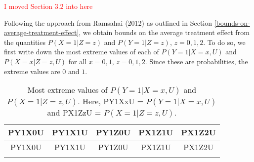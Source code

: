 \documentclass[
]{article}
\theoremstyle{plain}
\begin{document}
\textcolor{red}{I moved Section 3.2 into here}

Following the approach from Ramsahai (2012) as outlined in Section \ref{bounds-on-average-treatment-effect}, we obtain bounds on the average treatment effect from the quantities \(P(X = 1 | Z = z)\) and \(P(Y = 1 | Z = z)\), \(z = 0,1,2\). To do so, we first write down the most extreme values of each of \(P(Y = 1 | X = x, U)\) and \(P(X = x | Z = z, U)\) for all \(x=0,1\), \(z=0,1,2\). Since these are probabilities, the extreme values are \(0\) and \(1\).

\begin{longtable}[]{@{}ccccc@{}}
\caption{Most extreme values of \(P(Y = 1 | X = x, U)\) and \(P(X = 1 | Z = z, U)\). Here, PY1XxU = \(P(Y = 1 | X = x, U)\) and PX1ZzU = \(P(X = 1 | Z = z, U)\).}\tabularnewline
\toprule
\begin{minipage}[b]{0.11\columnwidth}\centering
PY1X0U\strut
\end{minipage} & \begin{minipage}[b]{0.11\columnwidth}\centering
PY1X1U\strut
\end{minipage} & \begin{minipage}[b]{0.11\columnwidth}\centering
PY1Z0U\strut
\end{minipage} & \begin{minipage}[b]{0.11\columnwidth}\centering
PX1Z1U\strut
\end{minipage} & \begin{minipage}[b]{0.11\columnwidth}\centering
PX1Z2U\strut
\end{minipage}\tabularnewline
\midrule
\endfirsthead
\toprule
\begin{minipage}[b]{0.11\columnwidth}\centering
PY1X0U\strut
\end{minipage} & \begin{minipage}[b]{0.11\columnwidth}\centering
PY1X1U\strut
\end{minipage} & \begin{minipage}[b]{0.11\columnwidth}\centering
PY1Z0U\strut
\end{minipage} & \begin{minipage}[b]{0.11\columnwidth}\centering
PX1Z1U\strut
\end{minipage} & \begin{minipage}[b]{0.11\columnwidth}\centering
PX1Z2U\strut
\end{minipage}\tabularnewline
\midrule
\endhead
\begin{minipage}[t]{0.11\columnwidth}\centering
0\strut

\end{minipage}
\end{longtable}
\end{document}
